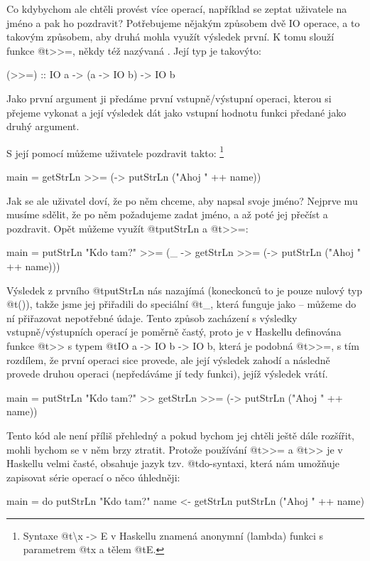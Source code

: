 Co kdybychom ale chtěli provést více operací, například se zeptat uživatele na
jméno a pak ho pozdravit? Potřebujeme nějakým způsobem  dvě IO
operace, a to takovým způsobem, aby druhá mohla využít výsledek první. K tomu
slouží funkce @t{>>=}, někdy též nazývaná . Její typ je takovýto:

\begin{haskell}
(>>=) :: IO a -> (a -> IO b) -> IO b
\end{haskell}

Jako první argument ji předáme první vstupně/výstupní operaci, kterou si přejeme
vykonat a její výsledek dát jako vstupní hodnotu funkci předané jako druhý
argument.

S její pomocí můžeme uživatele pozdravit takto: \footnote{Syntaxe
@t{\textbackslash x -> E} v Haskellu znamená anonymní (lambda) funkci s
parametrem @t{x} a tělem @t{E}.}

\begin{haskell}
main = getStrLn >>= (\name -> putStrLn ("Ahoj " ++ name))
\end{haskell}
  
Jak se ale uživatel doví, že po něm chceme, aby napsal svoje jméno? Nejprve mu
musíme sdělit, že po něm požadujeme zadat jméno, a až poté jej přečíst a
pozdravit. Opět můžeme využít @t{putStrLn} a @t{>>=}:

\begin{haskell}
main = 
  putStrLn "Kdo tam?" >>= (\_ ->
    getStrLn >>= (\name ->
      putStrLn ("Ahoj " ++ name)))
\end{haskell}

Výsledek z prvního @t{putStrLn} nás nazajímá (koneckonců to je pouze nulový typ
@t{()}), takže jsme jej přiřadili do speciální  @t{_}, která
funguje jako  -- můžeme do ní přiřazovat nepotřebné údaje. Tento
způsob zacházení s výsledky vstupně/výstupních operací je poměrně častý, proto
je v Haskellu definována funkce @t{>>} s typem @t{IO a -> IO b -> IO b}, která
je podobná @t{>>=}, s tím rozdílem, že první operaci sice provede, ale její
výsledek zahodí a následně provede druhou operaci (nepředáváme jí tedy funkci),
jejíž výsledek vrátí.

\begin{haskell}
main = 
  putStrLn "Kdo tam?" >>
    getStrLn >>= (\name ->
      putStrLn ("Ahoj " ++ name))
\end{haskell}

Tento kód ale není příliš přehledný a pokud bychom jej chtěli ještě dále rozšířit, mohli
bychom se v něm brzy ztratit. Protože používání @t{>>=} a @t{>>} je v Haskellu
velmi časté, obsahuje jazyk tzv. @t{do}-syntaxi, která nám umožňuje zapisovat
série operací o něco úhledněji:

\begin{haskell}
main = do
  putStrLn "Kdo tam?"
  name <- getStrLn
  putStrLn ("Ahoj " ++ name)
\end{haskell}

